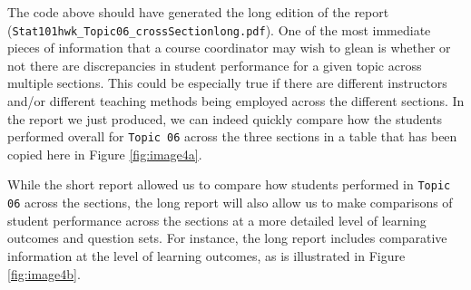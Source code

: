 \documentclass{article}\usepackage[]{graphicx}\usepackage[]{color}
\numberwithin{equation}{section} %
\begin{document}
The code above should have generated the long edition of the report (\texttt{Stat101hwk\_Topic06\_crossSection\-long.pdf}). One of the most immediate pieces of information that a course coordinator may wish to glean is whether or not there are discrepancies in student performance for a given topic across multiple sections. This could be especially true if there are different instructors and/or different teaching methods being employed across the different sections. In the report we just produced, we can indeed quickly compare how the students performed overall for \texttt{Topic 06} across the three sections in a table that has been copied here in Figure \ref{fig:image4a}.

\begin{center}
\captionsetup{width=0.7\textwidth}
\label{fig:image4a}
\end{center}

While the short report allowed us to compare how students performed in \texttt{Topic 06} across the sections, the long report will also allow us to make comparisons of student performance across the sections at a more detailed level of learning outcomes and question sets. For instance, the long report includes comparative information at the level of learning outcomes, as is illustrated in Figure \ref{fig:image4b}.
\end{document}
